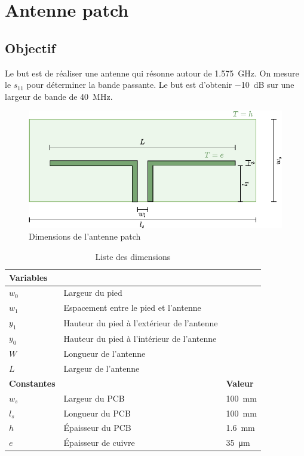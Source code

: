\documentclass[Deriaz_Traiber_Labo02.tex]{subfiles}
\begin{document}
\chapter{Antenne patch}
\section{Objectif}
Le but est de réaliser une antenne qui résonne autour de \SI{1.575}{\giga\hertz}. On mesure le $s_{11}$ pour déterminer la bande passante. Le but est d'obtenir \SI{-10}{\deci\bel} sur une largeur de bande de \SI{40}{\mega\hertz}.

\begin{figure}[H]
\centering
\includegraphics[scale=1,page=2]{../Schemas-crop.pdf}
\caption{Dimensions de l'antenne patch}
\end{figure}
\begin{table}[H]
\centering
\begin{tabular}{lll}
\textbf{Variables}\\\hline
$w_0$ & Largeur du pied\\
$w_1$ & Espacement entre le pied et l'antenne\\
$y_1$ & Hauteur du pied à l'extérieur de l'antenne\\
$y_0$ & Hauteur du pied à l'intérieur de l'antenne\\
$W$ & Longueur de l'antenne\\
$L$ & Largeur de l'antenne\\
\textbf{Constantes} & & \textbf{Valeur}\\\hline
$w_s$ & Largeur du PCB & \SI{100}{\milli\meter}\\
$l_s$ & Longueur du PCB & \SI{100}{\milli\meter}\\
$h$ & Épaisseur du PCB & \SI{1.6}{\milli\meter}\\
$e$ & Épaisseur de cuivre & \SI{35}{\micro\meter}
\end{tabular}
\caption{Liste des dimensions}
\end{table}
\end{document}
